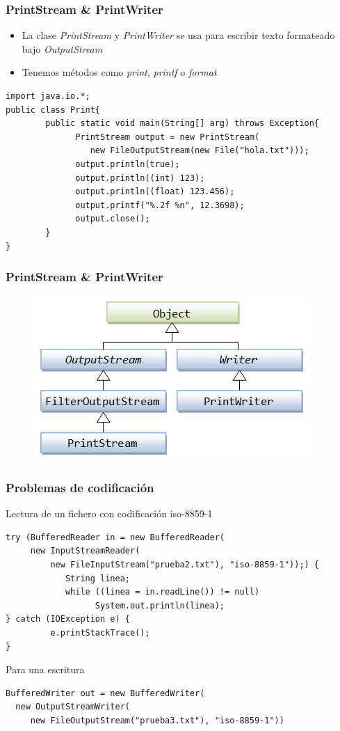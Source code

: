 \documentclass{beamer}
\begin{document}
\begin{frame}[fragile]
\frametitle{PrintStream \& PrintWriter}
\begin{itemize}[<+->]
\item La clase \emph{PrintStream} y \emph{PrintWriter} se usa para escribir texto formateado bajo \emph{OutputStream}
\item Tenemos métodos como \emph{print}, \emph{printf} o \emph{format}
\end{itemize}
\pause
\begin{small}
\begin{verbatim}
import java.io.*;
public class Print{
        public static void main(String[] arg) throws Exception{
              PrintStream output = new PrintStream(
                 new FileOutputStream(new File("hola.txt")));
              output.println(true);
              output.println((int) 123);
              output.println((float) 123.456);
              output.printf("%.2f %n", 12.3698);
              output.close();
        }
}
\end{verbatim}
\end{small}
\end{frame}

\begin{frame}
\frametitle{PrintStream \& PrintWriter}
\begin{figure}
\includegraphics[scale=0.8]{imagenes/PW.png}
\end{figure}
\end{frame}

\begin{frame}[fragile]
\frametitle{Problemas de codificación}
Lectura de un fichero con codificación iso-8859-1
\begin{verbatim}
try (BufferedReader in = new BufferedReader(
     new InputStreamReader(
         new FileInputStream("prueba2.txt"), "iso-8859-1"));) {
            String linea;
            while ((linea = in.readLine()) != null)
                  System.out.println(linea);
} catch (IOException e) {
         e.printStackTrace();
}
\end{verbatim}
Para una escritura
\begin{verbatim}
BufferedWriter out = new BufferedWriter(
  new OutputStreamWriter(
     new FileOutputStream("prueba3.txt"), "iso-8859-1"))
\end{verbatim}
\end{frame}
\end{document}
